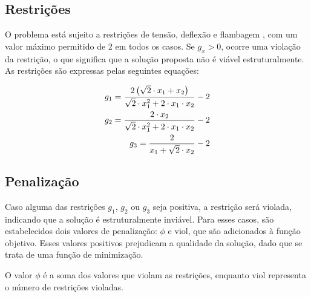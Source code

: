 
\subsection{Restrições}

O problema está sujeito a restrições de tensão, deflexão e flambagem
, com um valor máximo permitido de 2 em todos os casos. Se \(g_x > 0\), ocorre uma violação da restrição, o que significa que a solução proposta não é viável estruturalmente.
As restrições são expressas pelas seguintes equações:

\begin{gather}
    \begin{subequations}
        \begin{align}
            \begin{split}
                g_1 = \frac{2 \left( \sqrt{2} \cdot x_1 + x_2 \right)}{\sqrt{2} \cdot x_1^2 + 2 \cdot x_1 \cdot x_2} - 2
            \end{split}
            \\
            \begin{split}
                g_2 = \frac{2 \cdot x_2}{\sqrt{2} \cdot x_1^2 + 2 \cdot x_1 \cdot x_2} - 2
            \end{split}
            \\
            \begin{split}
                g_3 = \frac{2}{x_1 + \sqrt{2} \cdot x_2} - 2
            \end{split}
        \end{align}
    \end{subequations}
\end{gather}

\subsection{Penalização}

Caso alguma das restrições \(g_1\), \(g_2\) ou \(g_3\) seja positiva, a restrição será violada, indicando que a solução é estruturalmente inviável. Para esses casos, são estabelecidos dois valores de penalização: \(\phi\) e \(\text{viol}\), que são adicionados à função objetivo. Esses valores positivos prejudicam a qualidade da solução, dado que se trata de uma função de minimização.

O valor \(\phi\) é a soma dos valores que violam as restrições, enquanto \(\text{viol}\) representa o número de restrições violadas.

